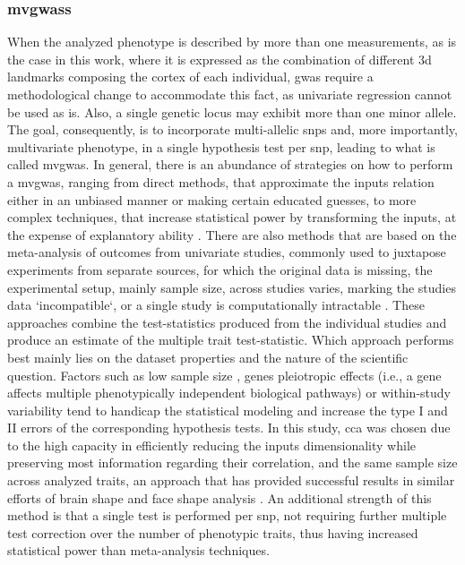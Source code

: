 \subsubsection{\Acfp{mvgwas}}
When the analyzed phenotype is described by more than one measurements, as is the case in this work, where it is expressed as the combination of different \ac{3d} landmarks composing the cortex of each individual, \ac{gwas} require a methodological change to accommodate this fact, as univariate regression cannot be used as is. Also, a single genetic locus may exhibit more than one minor allele. The goal, consequently, is to incorporate multi-allelic \acsp{snp} and, more importantly, multivariate phenotype, in a single hypothesis test per \ac{snp}, leading to what is called \acf{mvgwas}. In general, there is an abundance of strategies on how to perform a \ac{mvgwas}, ranging from direct methods, that approximate the inputs relation either in an unbiased manner or making certain educated guesses, to more complex techniques, that increase statistical power by transforming the inputs, at the expense of explanatory ability \cite{Galesloot2014}. There are also methods that are based on the meta-analysis of outcomes from univariate studies, commonly used to juxtapose experiments from separate sources, for which the original data is missing, the experimental setup, mainly sample size, across studies varies, marking the studies data `incompatible`, or a single study is computationally intractable \cite{Uffelmann2021,Cichonska2016}. These approaches combine the test-statistics produced from the individual studies and produce an estimate of the multiple trait test-statistic. Which approach performs best mainly lies on the dataset properties and the nature of the scientific question. Factors such as low sample size \cite{Sheng2021}, genes pleiotropic effects \cite{Fernandes2021} (i.e., a gene affects multiple phenotypically independent biological pathways) or within-study variability \cite{Usui2021,Jackson2011} tend to handicap the statistical modeling and increase the type I and II errors of the corresponding hypothesis tests. In this study, \ac{cca} was chosen due to the high capacity in efficiently reducing the inputs dimensionality while preserving most information regarding their correlation, and the same sample size across analyzed traits, an approach that has provided successful results in similar efforts of brain shape and face shape analysis \cite{Claes2018,Naqvi2021}. An additional strength of this method is that a single test is performed per \ac{snp}, not requiring further multiple test correction over the number of phenotypic traits, thus having increased statistical power than meta-analysis techniques.



